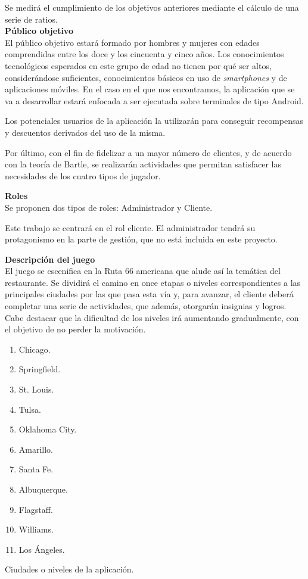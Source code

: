 \documentclass[twoside]{report}
\begin{document}
Se medirá el cumplimiento de los objetivos anteriores mediante el cálculo de una serie de ratios.\\

\textbf{Público objetivo}\\

El público objetivo estará formado por hombres y mujeres con edades comprendidas entre los doce y los cincuenta y cinco años. 
Los conocimientos tecnológicos esperados en este grupo de edad no tienen por qué ser altos, considerándose suficientes, conocimientos básicos en uso de \textit{smartphones} y de aplicaciones móviles. En el caso en el que nos encontramos, la aplicación que se va a desarrollar estará enfocada a ser ejecutada sobre terminales de tipo Android.

Los potenciales usuarios de la aplicación la utilizarán para conseguir recompensas y descuentos derivados del uso de la misma.

Por último, con el fin de fidelizar a un mayor número de clientes, y de acuerdo con la \cite{iebsctj} teoría de Bartle, se realizarán actividades que permitan satisfacer las necesidades de los cuatro tipos de jugador.

\textbf{Roles}\\

Se proponen dos tipos de roles: Administrador y Cliente.

Este trabajo se centrará en el rol cliente. El administrador tendrá su protagonismo en la parte de gestión, que no está incluida en este proyecto.

\textbf{Descripción del juego}\\

El juego se escenifica en la Ruta 66 americana que alude así la temática del restaurante. Se dividirá el camino en once etapas o niveles correspondientes a las principales ciudades por las que pasa esta vía y, para avanzar, el cliente deberá completar una serie de actividades, que además, otorgarán insignias y logros. Cabe destacar que la dificultad de los niveles irá aumentando gradualmente, con el objetivo de no perder la motivación.

\begin{table}[H]
\begin{multicols}{4}
\begin{enumerate}
\item Chicago.
\item Springfield.
\item St. Louis.
\item Tulsa.
\item Oklahoma City.
\item Amarillo.
\item Santa Fe.
\item Albuquerque.
\item Flagstaff.
\item Williams.
\item Los Ángeles.
\end{enumerate}
\end{multicols}
\caption{Ciudades o niveles de la aplicación.}
\end{table}
\end{document}
